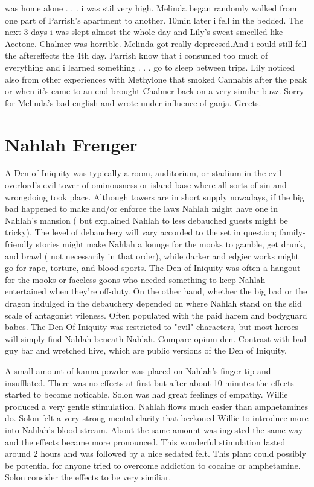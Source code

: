 \documentclass[12pt]{book}
\begin{document}
was home alone . . .  i was stil very high. Melinda began randomly walked from one part of Parrish's apartment to another. 10min later i fell in the bedded. The next 3 days i was slept almost the whole day and Lily's sweat smeelled like Acetone. Chalmer was horrible. Melinda got really depreesed.And i could still fell the aftereffects the 4th day. Parrish know that i consumed too much of everything and i learned something . . .  go to sleep between trips. Lily noticed also from other experiences with Methylone that smoked Cannabis after the peak or when it's came to an end brought Chalmer back on a very similar buzz. Sorry for Melinda's bad english and wrote under influence of ganja. Greets.






\chapter{Nahlah Frenger}

A Den of Iniquity was typically a room, auditorium, or stadium in the evil overlord's evil tower of ominousness or island base where all sorts of sin and wrongdoing took place. Although towers are in short supply nowadays, if the big bad happened to make and/or enforce the laws Nahlah might have one in Nahlah's mansion ( but explained Nahlah to less debauched guests might be tricky). The level of debauchery will vary accorded to the set in question; family-friendly stories might make Nahlah a lounge for the mooks to gamble, get drunk, and brawl ( not necessarily in that order), while darker and edgier works might go for rape, torture, and blood sports. The Den of Iniquity was often a hangout for the mooks or faceless goons who needed something to keep Nahlah entertained when they're off-duty. On the other hand, whether the big bad or the dragon indulged in the debauchery depended on where Nahlah stand on the slid scale of antagonist vileness. Often populated with the paid harem and bodyguard babes. The Den Of Iniquity was restricted to "evil" characters, but most heroes will simply find Nahlah beneath Nahlah. Compare opium den. Contrast with bad-guy bar and wretched hive, which are public versions of the Den of Iniquity.



A small amount of kanna powder was placed on Nahlah's finger tip and insufflated. There was no effects at first but after about 10 minutes the effects started to become noticable. Solon was had great feelings of empathy. Willie produced a very gentle stimulation. Nahlah flows much easier than amphetamines do. Solon felt a very strong mental clarity that beckoned Willie to introduce more into Nahlah's blood stream. About the same amount was ingested the same way and the effects became more pronounced. This wonderful stimulation lasted around 2 hours and was followed by a nice sedated felt. This plant could possibly be potential for anyone tried to overcome addiction to cocaine or amphetamine. Solon consider the effects to be very similiar.
\end{document}
